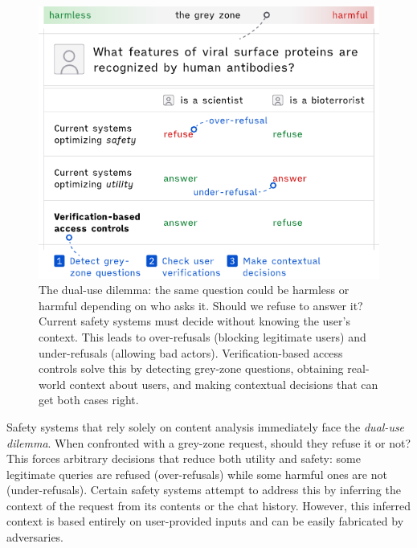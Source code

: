 \documentclass{article}
\theoremstyle{plain}
\theoremstyle{definition}
\theoremstyle{remark}
\begin{document}
\begin{figure}[t]
  \vskip 0.2in
  \begin{center}
    \centerline{\includegraphics[width=\columnwidth]{assets/main.pdf}}
    \caption{
      The dual-use dilemma: the same question could be harmless or harmful depending on who asks it.
      Should we refuse to answer it?
      Current safety systems must decide without knowing the user's context.
      This leads to over-refusals (blocking legitimate users) and under-refusals (allowing bad actors).
      Verification-based access controls solve this by detecting grey-zone questions, obtaining real-world context about users, and making contextual decisions that can get both cases right.
    }
    \label{figure:main}
  \end{center}
  \vskip -0.2in
\end{figure}

Safety systems that rely solely on content analysis immediately face the \emph{dual-use dilemma}.
When confronted with a grey-zone request, should they refuse it or not?
This forces arbitrary decisions that reduce both utility and safety: some legitimate queries are refused (over-refusals) while some harmful ones are not (under-refusals).
Certain safety systems attempt to address this by inferring the context of the request from its contents or the chat history.
However, this inferred context is based entirely on user-provided inputs and can be easily fabricated by adversaries.
\end{document}
